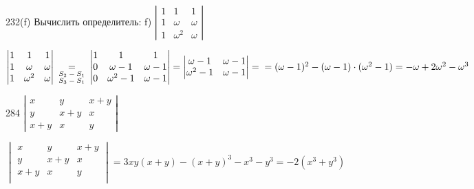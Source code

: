 \begin{problem}{232(f)}
Вычислить определитель:
f) $\left| \begin{array}{rrr}1 & 1 & 1 \\ 1 & \omega & \omega\\1 & \omega^2 & \omega \end{array} \right|$
\end{problem}
\begin{solution}
$
\begin{vmatrix}
	1 & 1 & 1 \\
	 1 & \omega & \omega\\
	 1 & \omega^2 & \omega\\
\end{vmatrix} \:
\underset{\begin{subarray}{l}{\text{$S_2-S_1$}}\\
	\text{$S_3-S_1$}\end{subarray}}{=} \:
\begin{vmatrix}
	1 & 1 & 1\\
	0 & \omega-1 & \omega-1\\
	0 & \omega^2-1 & \omega-1
\end{vmatrix}=
\begin{vmatrix}
	\omega-1 & \omega-1\\
	\omega^2-1 & \omega-1
\end{vmatrix}=\vspace{.1cm}\\=(\omega-1)^2-(\omega-1) \cdot (\omega^2-1) = -\omega + 2 \omega^2 - \omega^3
$\\
\end{solution} 

\newpage
\begin{problem}{284}
$\left| \begin{array}{rrr}x & y & x+y \\ y & x+y & x \\ x+y & x & y \end{array} \right|$
\end{problem}
\begin{solution}
$
\begin{vmatrix}
	x   & y   & x+y\\
	y   & x+y & x\\
	x+y & x   & y\\
\end{vmatrix}=3xy(x+y)-(x+y)^3-x^3-y^3=-2(x^3+y^3)
$\\

\end{solution} 
